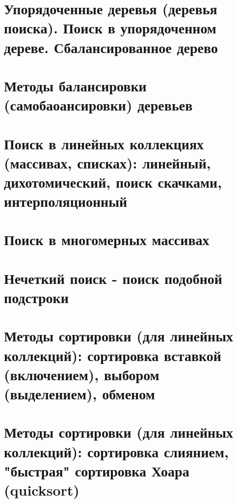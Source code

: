 \section{Упорядоченные деревья (деревья поиска). Поиск в упорядоченном дереве.  Сбалансированное дерево}
\section{Методы балансировки (самобаоансировки) деревьев}
\section{Поиск в линейных коллекциях (массивах, списках): линейный, дихотомический, поиск скачками, интерполяционный}
\section{Поиск в многомерных массивах}
\section{Нечеткий поиск - поиск подобной подстроки}
\section{Методы сортировки (для линейных коллекций): сортировка вставкой (включением), выбором (выделением), обменом}
\section{Методы сортировки (для линейных коллекций): сортировка слиянием, "быстрая" сортировка Хоара (quicksort)}

